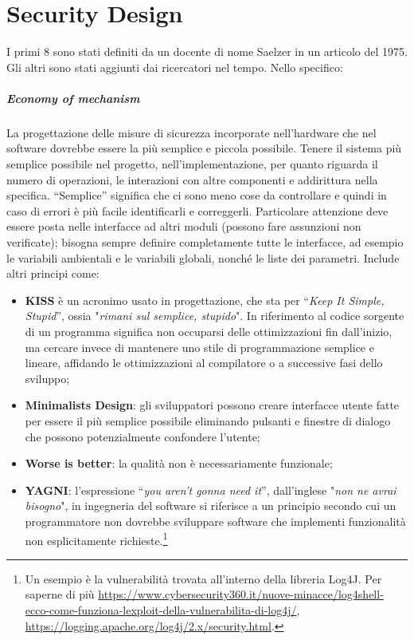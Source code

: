 \chapter{Security Design}

I primi 8 sono stati definiti da un docente di nome
Saelzer in un articolo del 1975. Gli altri sono stati
aggiunti dai ricercatori nel tempo. Nello specifico:

\paragraph{Economy of mechanism}
La progettazione delle misure di sicurezza incorporate
nell'hardware che nel software dovrebbe essere la più semplice e piccola possibile.
Tenere il sistema più semplice possibile nel progetto, nell'implementazione,
per quanto riguarda il
numero di operazioni, le interazioni con altre componenti e addirittura nella
specifica. “Semplice”
significa che ci sono meno cose da controllare e quindi in caso di errori è più
facile identificarli e
correggerli.
Particolare attenzione deve essere posta nelle interfacce ad altri moduli
(possono fare assunzioni
non verificate); bisogna sempre definire completamente tutte le interfacce,
ad esempio le variabili
ambientali e le variabili globali, nonché le liste dei parametri.
Include altri principi come:

\begin{itemize}
    \item \textbf{KISS} è un acronimo usato in progettazione, che sta per
          “\textit{Keep It Simple, Stupid}”, ossia
          "\textit{rimani sul semplice, stupido}".
          In riferimento al codice sorgente di un programma significa
          non occuparsi delle ottimizzazioni fin dall'inizio, ma cercare invece
          di mantenere uno stile di
          programmazione semplice e lineare, affidando le ottimizzazioni al
          compilatore o a
          successive fasi dello sviluppo;
    \item \textbf{Minimalists Design}: gli sviluppatori possono creare interfacce
          utente fatte per essere il più
          semplice possibile eliminando pulsanti e finestre di dialogo che
          possono potenzialmente
          confondere l'utente;
    \item \textbf{Worse is better}: la qualità non è necessariamente funzionale;
    \item \textbf{YAGNI}: l'espressione “\textit{you aren't gonna need it}”,
          dall'inglese "\textit{non ne avrai bisogno}",
          in ingegneria del software si riferisce a un principio secondo cui un
          programmatore non dovrebbe sviluppare software che implementi funzionalità non
          esplicitamente richieste.\footnote{Un esempio è la vulnerabilità
              trovata all'interno della libreria Log4J. Per saperne di più
              \url{https://www.cybersecurity360.it/nuove-minacce/log4shell-ecco-come-funziona-lexploit-della-vulnerabilita-di-log4j/},
              \url{https://logging.apache.org/log4j/2.x/security.html}.}
\end{itemize}

